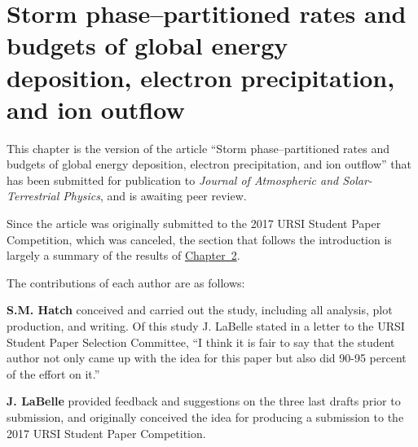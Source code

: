 
\chapter{Storm phase--partitioned rates and budgets of global \Alfic
  energy deposition, electron precipitation, and ion outflow}
\label{chp:3}

This chapter is the version of the article ``Storm phase--partitioned
rates and budgets of global \Alfic energy deposition, electron
precipitation, and ion outflow'' that has been submitted for
publication to \emph{Journal of Atmospheric and Solar-Terrestrial
  Physics}, and is awaiting peer review.

Since the article was originally submitted to the 2017 URSI Student
Paper Competition, which was canceled, the section that follows the
introduction is largely a summary of the results of
\hyperref[chp:2]{Chapter~2}.

The contributions of each author are as follows:

\textbf{S.M. Hatch} conceived and carried out the study, including all
analysis, plot production, and writing. Of this study J. LaBelle
stated in a letter to the URSI Student Paper Selection Committee, ``I
think it is fair to say that the student author not only came up with
the idea for this paper but also did 90-95 percent of the effort on
it.''

\textbf{J. LaBelle} provided feedback and suggestions on the three
last drafts prior to submission, and originally conceived the idea for
producing a submission to the 2017 URSI Student Paper Competition.

